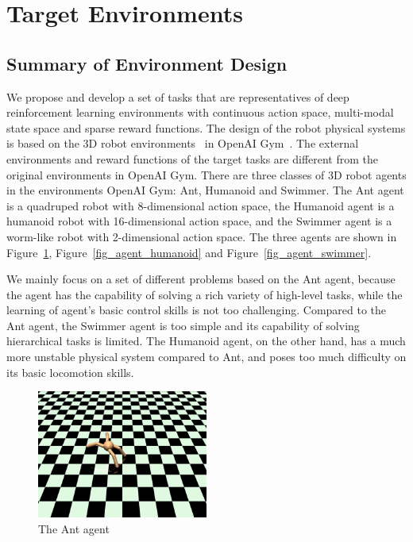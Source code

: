 \section{Target Environments}\label{sec_env}
\subsection{Summary of Environment Design}
We propose and develop a set of tasks that are representatives of deep reinforcement learning environments with continuous action space, multi-modal state space and sparse reward functions. The design of the robot physical systems is based on the 3D robot environments~\cite{roboschool_2018} in OpenAI Gym~\cite{openaigym}. The external environments and reward functions of the target tasks are different from the original environments in OpenAI Gym. There are three classes of 3D robot agents in the environments OpenAI Gym: Ant, Humanoid and Swimmer. The Ant agent is a quadruped robot with 8-dimensional action space, the Humanoid agent is a humanoid robot with 16-dimensional action space, and the Swimmer agent is a worm-like robot with 2-dimensional action space.  The three agents are shown in Figure~\ref{fig_agent_ant}, Figure~\ref{fig_agent_humanoid} and Figure~\ref{fig_agent_swimmer}.

We mainly focus on a set of different problems based on the Ant agent, because the agent has the capability of solving a rich variety of high-level tasks, while the learning of agent's basic control skills is not too challenging. 
Compared to the Ant agent, the Swimmer agent is too simple and its capability of solving hierarchical tasks is limited. The Humanoid agent, on the other hand, has a much more unstable physical system compared to Ant, and poses too much difficulty on its basic locomotion skills.
\begin{figure}[H]
	\includegraphics[width=0.5\textwidth]{images/agent_ant.png}
	\centering
	\caption{The Ant agent}\label{fig_agent_ant}
\end{figure}

